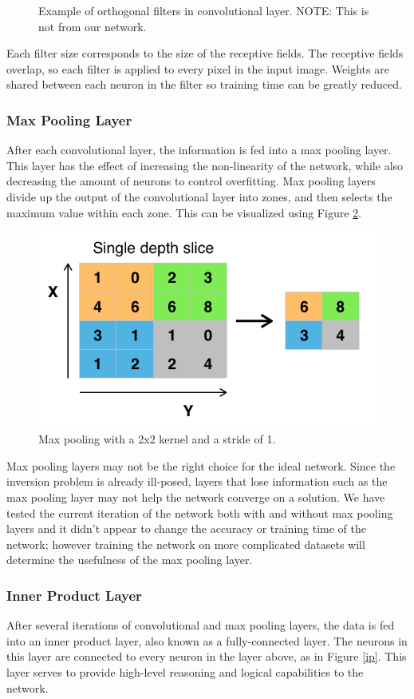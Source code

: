 \documentclass[twoside]{article}
\begin{document}
\begin{multicols}{2}
\begin{figure}[H]
    \caption{Example of orthogonal filters in convolutional layer. NOTE: This is not from our network.}
    \label{ortho}
\end{figure}
Each filter size corresponds to the size of the receptive fields. The receptive fields overlap, so each filter is applied to every pixel in the input image. Weights are shared between each neuron in the filter so training time can be greatly reduced.

\subsubsection{Max Pooling Layer}
After each convolutional layer, the information is fed into a max pooling layer. This layer has the effect of increasing the non-linearity of the network, while also decreasing the amount of neurons to control overfitting. Max pooling layers divide up the output of the convolutional layer into zones, and then selects the maximum value within each zone. This can be visualized using Figure \ref{pooling}.
\begin{figure}[H]
	\includegraphics[width=\linewidth]{images/Max_pooling}
	\caption{Max pooling with a 2x2 kernel and a stride of 1.}
	\label{pooling}
\end{figure}
Max pooling layers may not be the right choice for the ideal network. Since the inversion problem is already ill-posed, layers that lose information such as the max pooling layer may not help the network converge on a solution. We have tested the current iteration of the  network both with and without max pooling layers and it didn't appear to change the accuracy or training time of the network; however training the network on more complicated datasets will determine the usefulness of the max pooling layer.
\subsubsection{Inner Product Layer}
After several iterations of convolutional and max pooling layers, the data is fed into an inner product layer, also known as a fully-connected layer. The neurons in this layer are connected to every neuron in the layer above, as in Figure \ref{ip}. This layer serves to provide high-level reasoning and logical capabilities to the network.

\end{multicols}
\end{document}
